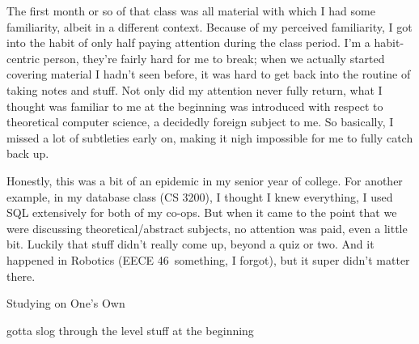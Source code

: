 \documentclass[../butidigress.tex]{subfiles}
\begin{document}
The first month or so of that class was all material with which I had some familiarity, albeit in a different context.
Because of my perceived familiarity, I got into the habit of only half paying attention during the class period.
I'm a habit-centric person, they're fairly hard for me to break; when we actually started covering material I hadn't seen before, it was hard to get back into the routine of taking notes and stuff.
Not only did my attention never fully return, what I thought was familiar to me at the beginning was introduced with respect to theoretical computer science, a decidedly foreign subject to me.
So basically, I missed a lot of subtleties early on, making it nigh impossible for me to fully catch back up.

Honestly, this  was a bit of an epidemic in my senior year of college.
For another example, in my database class (CS 3200), I thought I knew everything, I used SQL extensively for both of my co-ops.
But when it came to the point that we were discussing theoretical/abstract subjects, no attention was paid, even a little bit.
Luckily that stuff didn't really come up, beyond a quiz or two.
And it happened in Robotics (EECE 46\lips~something, I forgot), but it super didn't matter there.

\begin{somenotes}{Studying on One's Own}
    \item gotta slog through the  level stuff at the beginning
\end{somenotes}
\end{document}
